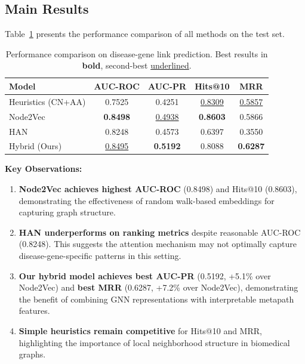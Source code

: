 \documentclass[11pt]{article}
\begin{document}
\subsection{Main Results}

Table~\ref{tab:main_results} presents the performance comparison of all methods on the test set.

\begin{table}[t]
\centering
\caption{Performance comparison on disease-gene link prediction. Best results in \textbf{bold}, second-best \underline{underlined}.}
\label{tab:main_results}
\begin{tabular}{lcccc}
\toprule
\textbf{Model} & \textbf{AUC-ROC} & \textbf{AUC-PR} & \textbf{Hits@10} & \textbf{MRR} \\
\midrule
Heuristics (CN+AA) & 0.7525 & 0.4251 & \underline{0.8309} & \underline{0.5857} \\
Node2Vec & \textbf{0.8498} & \underline{0.4938} & \textbf{0.8603} & 0.5866 \\
HAN & 0.8248 & 0.4573 & 0.6397 & 0.3550 \\
\midrule
Hybrid (Ours) & \underline{0.8495} & \textbf{0.5192} & 0.8088 & \textbf{0.6287} \\
\bottomrule
\end{tabular}
\end{table}

\textbf{Key Observations:}

\begin{enumerate}
    \item \textbf{Node2Vec achieves highest AUC-ROC} (0.8498) and Hits@10 (0.8603), demonstrating the effectiveness of random walk-based embeddings for capturing graph structure.

    \item \textbf{HAN underperforms on ranking metrics} despite reasonable AUC-ROC (0.8248). This suggests the attention mechanism may not optimally capture disease-gene-specific patterns in this setting.

    \item \textbf{Our hybrid model achieves best AUC-PR} (0.5192, +5.1\% over Node2Vec) and \textbf{best MRR} (0.6287, +7.2\% over Node2Vec), demonstrating the benefit of combining GNN representations with interpretable metapath features.

    \item \textbf{Simple heuristics remain competitive} for Hits@10 and MRR, highlighting the importance of local neighborhood structure in biomedical graphs.
\end{enumerate}
\end{document}

